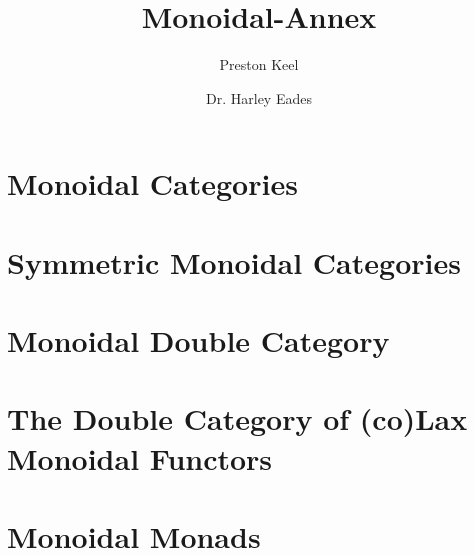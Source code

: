 \documentclass[11pt]{article}
\title{Monoidal-Annex}
\author{Preston Keel \and Dr. Harley Eades}
\begin{document}
\maketitle
\tableofcontents

\section{Monoidal Categories}
\label{sec:monoidal_categories}


\section{Symmetric Monoidal Categories}
\label{sec:symmetric_monoidal_categories}


\section{Monoidal Double Category}
\label{sec:monoidal_double_category}


\section{The Double Category of (co)Lax Monoidal Functors}
\label{sec:the_double_category_of_colax_monoidal_functors}


\section{Monoidal Monads}
\label{sec:monoidal_monads}




\end{document}
